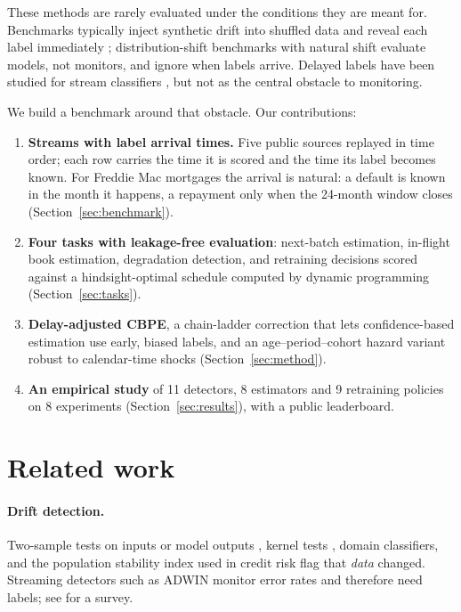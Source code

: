 \documentclass[11pt]{article}
\begin{document}
These methods are rarely evaluated under the conditions they are meant for. Benchmarks
typically inject synthetic drift into shuffled data and reveal each label immediately
\citep{cerqueira2026drift}; distribution-shift benchmarks with natural shift
\citep{koh2021wilds,yao2022wildtime} evaluate models, not monitors, and ignore when labels
arrive. Delayed labels have been studied for stream classifiers \citep{grzenda2020delayed}, but
not as the central obstacle to monitoring.

We build a benchmark around that obstacle. Our contributions:
\begin{enumerate}
  \item \textbf{Streams with label arrival times.} Five public sources replayed in time
  order; each row carries the time it is scored and the time its label becomes known. For
  Freddie Mac mortgages the arrival is natural: a default is known in the month it happens,
  a repayment only when the 24-month window closes (Section~\ref{sec:benchmark}).
  \item \textbf{Four tasks with leakage-free evaluation}: next-batch estimation, in-flight
  book estimation, degradation detection, and retraining decisions scored against a
  hindsight-optimal schedule computed by dynamic programming (Section~\ref{sec:tasks}).
  \item \textbf{Delay-adjusted CBPE}, a chain-ladder \citep{mack1993chainladder} correction that
  lets confidence-based estimation use early, biased labels, and an age--period--cohort hazard
  variant robust to calendar-time shocks (Section~\ref{sec:method}).
  \item \textbf{An empirical study} of 11 detectors, 8 estimators and 9 retraining policies on
  8 experiments (Section~\ref{sec:results}), with a public leaderboard.
\end{enumerate}

\section{Related work}

\paragraph{Drift detection.} Two-sample tests on inputs or model outputs
\citep{rabanser2019failing}, kernel tests \citep{gretton2012kernel}, domain classifiers, and
the population stability index used in credit risk flag that \emph{data} changed. Streaming
detectors such as ADWIN \citep{bifet2007adwin} monitor error rates and therefore need labels;
see \citet{gama2014survey} for a survey.
\end{document}
